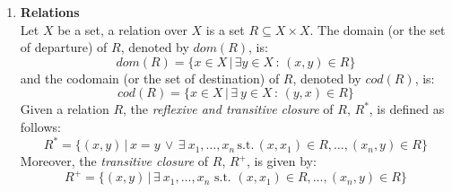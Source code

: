 \begin{enumerate}
\begin{itemize}
\begin{itemize}
        \noindent $C_2 \ominus C_1 = %
        (
        \{ r^1_1.(n_1,m^1_1), \ldots, r^1_{i_{n_{1}}}.(n_1,m^1_{i_{n_{1}}}),
        \ldots,
        r^l_1.(n_l,m^l_1), \ldots,(r^l_{j} - 1).(n_l,m^l_j),\\
        \ldots,
        r^l_{i_{n_{l}}}.(n_l,m^l_{i_{n_{l}}}), 
        \ldots, r^k_1.(n_k,m^k_1),\ldots, r^k_{i_{n_{k}}}.(n_k,m^k_{i_{n_{k}}}) \}
        ) 
        \ominus (C_1 - \{ 1.(n_l,m) \})
        $.

        Thus, $C_2 \ominus C_1$ is obtained by removing from $C_2$ 
        elements $(n,m)$ that correspond to elements $(n,m')$ of $C_1$,
        such that $m$ is the largest value with $m\leq m'$.

        \vspace*{0.12cm}

        For instance, taking $C_1 = \{
             1.(2,3), 1.(2,5), 1.(1,4), 1.(7,6)
        \}$, and $C_2 = $ \linebreak
        $\{
             1.(2,0), 1.(2,1), 1.(2,2), 1.(1,3), 2.(7,6), 3.(3,3)
        \}$ it follows that $C_1 \preceq C_2$. Then,
        $C_2 \ominus C_1= \{
            1.(2,0), 1.(7,6), 3.(3,3)
        \}$.
  \end{itemize} 
\end{itemize}

The last multiset operations are related with the definition of binding and firing for coloured Petri nets.

\item {\bf Relations}\\
Let $X$ be a set, a relation over $X$ is a set $R \subseteq X \times X$. 
The domain (or the set of departure) of $R$, denoted by $dom(R)$, is:
\[dom(R) = \{ x \in X \,|\, \exists
y \in X\,:\, (x,y) \in R \}\]
and the codomain (or the set of destination) of $R$, denoted by $cod(R)$, is:
\[cod(R) = \{ x \in X \,|\, \exists\ y \in X\,:\,(y,x) \in R\}\]
Given a relation $R$, the {\it reflexive and transitive closure} of $R$, $R^*$, is defined as follows:
\[ R^* = \{ (x,y)\,|\,x=y \,\vee\,
\exists\ x_1,\ldots,x_n\, \text{s.t.} \,(x,x_1)\in R,\ldots,(x_n,y) \in R\}\]
Moreover, the {\it transitive closure} of $R$, $R^+$, is given by:
\[R^+ = \{ (x,y)\,|\,
\exists \ x_1,\ldots,x_n \text{ s.t. } (x,x_1)\in R,\ldots,(x_n,y) \in R\}\]

\end{enumerate}


